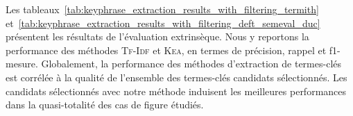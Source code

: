         Les
        tableaux~\ref{tab:keyphrase_extraction_results_with_filtering_termith}
        et~\ref{tab:keyphrase_extraction_results_with_filtering_deft_semeval_duc}
        présentent les résultats de l'évaluation extrinsèque. Nous y reportons
        la performance des méthodes \textsc{Tf-Idf} et \textsc{Kea}, en termes
        de précision, rappel et f1-mesure.
        Globalement, la performance des méthodes d'extraction de termes-clés est
        corrélée à la qualité de l'ensemble des termes-clés candidats
        sélectionnés. Les candidats sélectionnés avec notre méthode induisent
        les meilleures performances dans la quasi-totalité des cas de figure
        étudiés.
        \begin{table}[t]
          \centering

\end{table}
